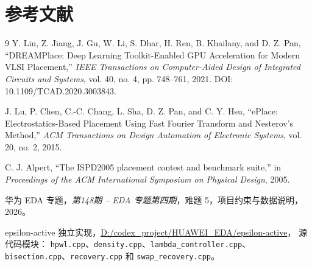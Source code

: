 \documentclass[UTF8,a4paper,11pt]{ctexrep}
\begin{document}
\chapter{参考文献}
\begin{thebibliography}{9}
Y. Lin, Z. Jiang, J. Gu, W. Li, S. Dhar, H. Ren, B. Khailany, and D. Z. Pan,
``DREAMPlace: Deep Learning Toolkit-Enabled GPU Acceleration for Modern VLSI Placement,''
\emph{IEEE Transactions on Computer-Aided Design of Integrated Circuits and Systems},
vol. 40, no. 4, pp. 748--761, 2021. DOI: 10.1109/TCAD.2020.3003843.

J. Lu, P. Chen, C.-C. Chang, L. Sha, D. Z. Pan, and C. Y. Hsu,
``ePlace: Electrostatics-Based Placement Using Fast Fourier Transform and Nesterov's Method,''
\emph{ACM Transactions on Design Automation of Electronic Systems}, vol. 20, no. 2, 2015.

C. J. Alpert, ``The ISPD2005 placement contest and benchmark suite,''
in \emph{Proceedings of the ACM International Symposium on Physical Design}, 2005.

华为 EDA 专题，\emph{第148期 -- EDA 专题第四期}，难题 5，项目约束与数据说明，2026。

epsilon-active 独立实现，\url{D:/codex_project/HUAWEI_EDA/epsilon-active}，
源代码模块：
\texttt{hpwl.cpp}、\texttt{density.cpp}、\texttt{lambda\_controller.cpp}、
\texttt{bisection.cpp}、\texttt{recovery.cpp} 和 \texttt{swap\_recovery.cpp}。
\end{thebibliography}
\end{document}
